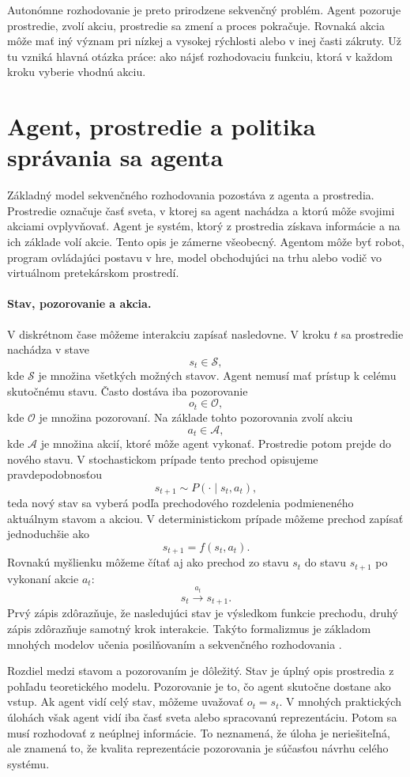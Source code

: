 Autonómne rozhodovanie je preto prirodzene sekvenčný problém. Agent pozoruje prostredie, zvolí akciu, prostredie sa zmení a proces pokračuje. Rovnaká akcia môže mať iný význam pri nízkej a vysokej rýchlosti alebo v inej časti zákruty. Už tu vzniká hlavná otázka práce: ako nájsť rozhodovaciu funkciu, ktorá v každom kroku vyberie vhodnú akciu.

\section{Agent, prostredie a politika správania sa agenta}

Základný model sekvenčného rozhodovania pozostáva z agenta a prostredia. Prostredie označuje časť sveta, v ktorej sa agent nachádza a ktorú môže svojimi akciami ovplyvňovať. Agent je systém, ktorý z prostredia získava informácie a na ich základe volí akcie. Tento opis je zámerne všeobecný. Agentom môže byť robot, program ovládajúci postavu v hre, model obchodujúci na trhu alebo vodič vo virtuálnom pretekárskom prostredí.

\paragraph{Stav, pozorovanie a akcia.}
V diskrétnom čase môžeme interakciu zapísať nasledovne. V kroku $t$ sa prostredie nachádza v stave
\[
    s_t \in \mathcal{S},
\]
kde $\mathcal{S}$ je množina všetkých možných stavov. Agent nemusí mať prístup k celému skutočnému stavu. Často dostáva iba pozorovanie
\[
    o_t \in \mathcal{O},
\]
kde $\mathcal{O}$ je množina pozorovaní. Na základe tohto pozorovania zvolí akciu
\[
    a_t \in \mathcal{A},
\]
kde $\mathcal{A}$ je množina akcií, ktoré môže agent vykonať. Prostredie potom prejde do nového stavu. V stochastickom prípade tento prechod opisujeme pravdepodobnosťou
\[
    s_{t+1} \sim P(\cdot \mid s_t, a_t),
\]
teda nový stav sa vyberá podľa prechodového rozdelenia podmieneného aktuálnym stavom a akciou. V deterministickom prípade môžeme prechod zapísať jednoduchšie ako
\[
    s_{t+1} = f(s_t, a_t).
\]
Rovnakú myšlienku môžeme čítať aj ako prechod zo stavu $s_t$ do stavu $s_{t+1}$ po vykonaní akcie $a_t$:
\[
    s_t \xrightarrow{\,a_t\,} s_{t+1}.
\]
Prvý zápis zdôrazňuje, že nasledujúci stav je výsledkom funkcie prechodu, druhý zápis zdôrazňuje samotný krok interakcie. Takýto formalizmus je základom mnohých modelov učenia posilňovaním a sekvenčného rozhodovania \cite{sutton_barto2018rl}.

Rozdiel medzi stavom a pozorovaním je dôležitý. Stav je úplný opis prostredia z pohľadu teoretického modelu. Pozorovanie je to, čo agent skutočne dostane ako vstup. Ak agent vidí celý stav, môžeme uvažovať $o_t = s_t$. V mnohých praktických úlohách však agent vidí iba časť sveta alebo spracovanú reprezentáciu. Potom sa musí rozhodovať z neúplnej informácie. To neznamená, že úloha je neriešiteľná, ale znamená to, že kvalita reprezentácie pozorovania je súčasťou návrhu celého systému.

